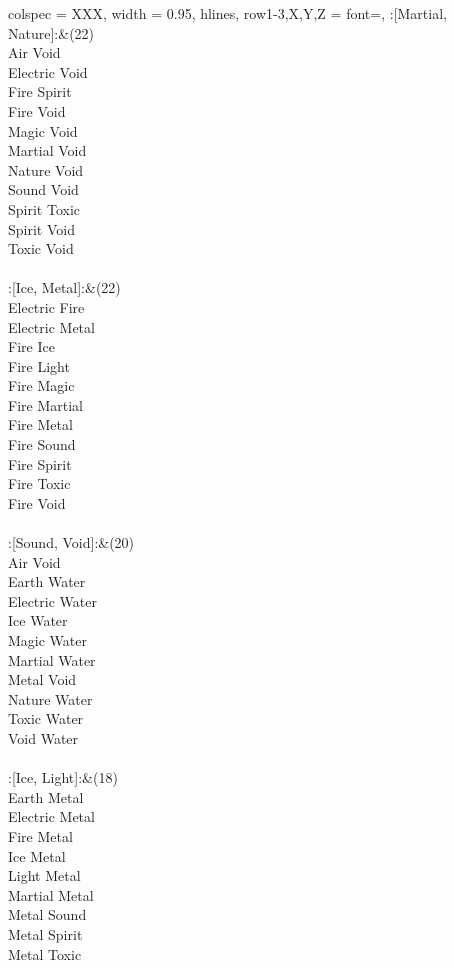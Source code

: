 \begin{longtblr}[
	caption = {2v2 Defending Resisted},
	label = {2v2-Defending-Resisted},
]{
	colspec = {XXX}, width = 0.95\linewidth,
	hlines,
	row{1-3,X,Y,Z} = {font=\bfseries},
}
	:[Martial, Nature]:&{(22)\\
	Air Void \\
	Electric Void \\
	Fire Spirit \\
	Fire Void \\
	Magic Void \\
	Martial Void \\
	Nature Void \\
	Sound Void \\
	Spirit Toxic \\
	Spirit Void \\
	Toxic Void \\
	}\\

	:[Ice, Metal]:&{(22)\\
	Electric Fire \\
	Electric Metal \\
	Fire Ice \\
	Fire Light \\
	Fire Magic \\
	Fire Martial \\
	Fire Metal \\
	Fire Sound \\
	Fire Spirit \\
	Fire Toxic \\
	Fire Void \\
	}\\

	:[Sound, Void]:&{(20)\\
	Air Void \\
	Earth Water \\
	Electric Water \\
	Ice Water \\
	Magic Water \\
	Martial Water \\
	Metal Void \\
	Nature Water \\
	Toxic Water \\
	Void Water \\
	}\\

	:[Ice, Light]:&{(18)\\
	Earth Metal \\
	Electric Metal \\
	Fire Metal \\
	Ice Metal \\
	Light Metal \\
	Martial Metal \\
	Metal Sound \\
	Metal Spirit \\
	Metal Toxic \\
	}\\


\end{longtblr}
